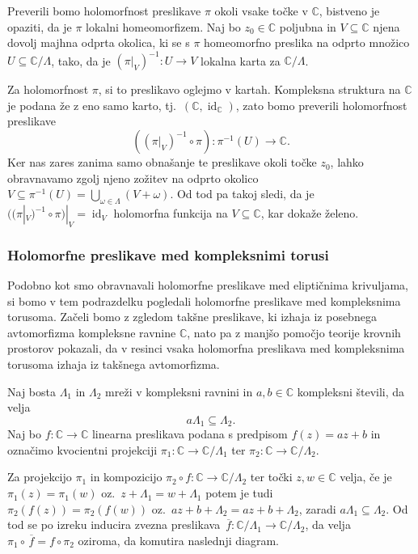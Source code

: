 \documentclass[mat1]{fmfdelo}
\numberwithin{equation}{section}
\newcommand{\C}{\mathbb C}
\newcommand{\om}{\omega}
\newcommand{\inv}{^{-1}}
\newcommand{\torus}{\C/\Lambda}
\newcommand{\olsi}[1]{\,\overline{\!{#1}}} %
\newcommand{\tj}{tj.\ }
\newcommand{\oz}{oz.\ }
\DeclareMathOperator{\id}{id}
\theoremstyle{definition}
\begin{document}
\begin{dokaz}
    Preverili bomo holomorfnost preslikave $\pi$ okoli vsake točke v $\C$, bistveno je opaziti, da je $\pi$ lokalni homeomorfizem. Naj bo $z_0 \in \C$ poljubna in $V \subseteq \C$ njena dovolj majhna odprta okolica, ki se s $\pi$ homeomorfno preslika na odprto množico $U \subseteq \torus$, tako, da je $(\pi|_{V})\inv : U \to V$ lokalna karta za $\torus$. 

    Za holomorfnost $\pi$, si to preslikavo oglejmo v kartah. Kompleksna struktura na $\C$ je podana že z eno samo karto, \tj $(\C, \id_\C)$, zato bomo preverili holomorfnost preslikave
    \[
        ((\pi|_{V})\inv \circ \pi) : \pi\inv(U) \to \C.
    \]
    Ker nas zares zanima samo obnašanje te preslikave okoli točke $z_0$, lahko obravnavamo zgolj njeno zožitev na odprto okolico $V \subseteq \pi\inv(U) = \bigcup_{\om \in \Lambda} (V + \om)$. Od tod pa takoj sledi, da je $((\pi|_V)\inv \circ \pi)|_V = \id_V$ holomorfna funkcija na $V \subseteq \C$, kar dokaže želeno. 
\end{dokaz}

\subsubsection{Holomorfne preslikave med kompleksnimi torusi}

Podobno kot smo obravnavali holomorfne preslikave med eliptičnima krivuljama, si bomo v tem podrazdelku pogledali holomorfne preslikave med kompleksnima torusoma. Začeli bomo z zgledom takšne preslikave, ki izhaja iz posebnega avtomorfizma kompleksne ravnine $\C$, nato pa z manjšo pomočjo teorije krovnih prostorov pokazali, da v resinci vsaka holomorfna preslikava med kompleksnima torusoma izhaja iz takšnega avtomorfizma. 

\begin{zgled*}
    Naj bosta $\Lambda_1$ in $\Lambda_2$ mreži v kompleksni ravnini in $a, b \in \C$ kompleksni števili, da velja
    \[
        a\Lambda_1 \subseteq \Lambda_2.
    \]
    Naj bo $f : \C \to \C$ linearna preslikava podana s predpisom $f(z) = az + b$ in označimo kvocientni projekciji $\pi_1 : \C \to \C/\Lambda_1$ ter $\pi_2 : \C \to \C/\Lambda_2$. 

    Za projekcijo $\pi_1$ in kompozicijo $\pi_2 \circ f : \C \to \C/\Lambda_2$ ter točki $z, w \in \C$ velja, če je $\pi_1(z) = \pi_1(w)$ \oz $z + \Lambda_1 = w + \Lambda_1$ potem je tudi $\pi_2(f(z)) = \pi_2(f(w))$ \oz $az + b + \Lambda_2 = az + b + \Lambda_2$, zaradi $a\Lambda_1 \subseteq \Lambda_2$. Od tod se po izreku \cite[]{MrcunTop} inducira zvezna preslikava $\olsi{f} : \C/\Lambda_1 \to \C/\Lambda_2$, da velja $\pi_1 \circ \olsi{f} = f \circ \pi_2$ oziroma, da komutira naslednji diagram.



\end{zgled*}
\end{document}
